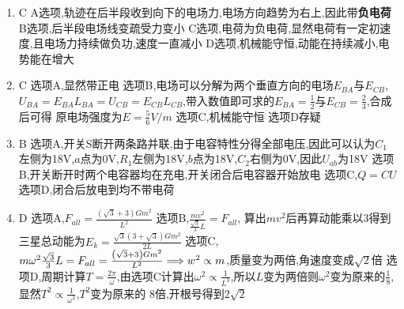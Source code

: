 \documentclass{article}
\begin{document}
\begin{enumerate}
            \item C  \newline
            A选项,轨迹在后半段收到向下的电场力,电场方向趋势为右上,因此带\textbf{负电荷}     \newline
            B选项,后半段电场线变疏受力变小      \newline
            C选项,电荷为负电荷,显然电荷有一定初速度,且电场力持续做负功,速度一直减小     \newline 
            D选项,机械能守恒,动能在持续减小,电势能在增大
            \item C \newline 
            选项A,显然带正电    \newline 
            选项B,电场可以分解为两个垂直方向的电场$E_{BA}$与$E_{CB}$,$U_{BA} = E_{BA} L_{BA} = U_{CB} = E_{CB} L_{CB}$,带入数值即可求的$E_{BA} = \frac{1}{2}$与$E_{CB} = \frac{2}{3}$,合成后可得
            原电场强度为$ E = \frac{5}{6} V/m $     \newline 
            选项C,机械能守恒    \newline 
            选项D存疑
            \item B     \newline 
            选项A,开关S断开两条路并联,由于电容特性分得全部电压,因此可以认为$C_{1}$左侧为18V,$a$点为0V,$R_{1}$左侧为18V,$b$点为18V,$C_{2}$右侧为0V,因此$U_{ab}$为18V     \newline 
            选项B,开关断开时两个电容器均在充电,开关闭合后电容器开始放电     \newline 
            选项C,$ Q = CU $    \newline 
            选项D,闭合后放电到均不带电荷
            \item D     \newline  
            选项A,$F_{all} =  \frac{ \left(\sqrt{3} + 3 \right)  G m^{2} }{L^{2}}$    \newline 
            选项B,$ \frac{m v^{2}}{\frac{\sqrt{3}}{3} L} = F_{all} $, 算出$mv^{2}$后再算动能乘以3得到三星总动能为$ E_{k} = \frac{\sqrt{3} \left( 3 + \sqrt{3} \right) G m^{2} }{2L} $   \newline 
            选项C,$ m \omega^{2} \frac{\sqrt{3}}{3} L = F_{all} = \frac{ \left(\sqrt{3} + 3 \right)  G m^{2} }{L^{2}} \Longrightarrow w^{2} \propto m $,质量变为两倍,角速度变成$\sqrt{2}$倍    \newline 
            选项D,周期计算$ T = \frac{2\pi}{\omega} $,由选项C计算出$ \omega^{2} \propto \frac{1}{L^{3}} $,所以$L$变为两倍则$\omega^{2}$变为原来的$\frac{1}{8}$,显然$ T^{2} \propto \frac{1}{\omega^{2}} $,$T^{2}$变为原来的
            8倍,开根号得到$2\sqrt{2}$

        \end{enumerate}
\end{document}
